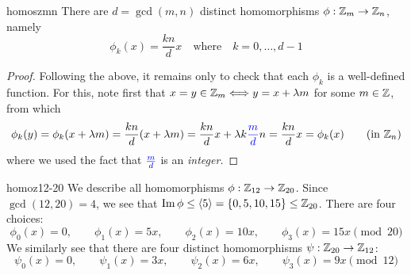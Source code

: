 \begin{cor}{}{homoszmn}
	There are $d=\gcd(m,n)$ distinct homomorphisms $\phi:\mathbb{Z}_m\to\mathbb{Z}_n$, namely
	\[
		\phi_k(x)=\frac{kn}{d}x
		\quad\text{where}\quad 
		k=0,\ldots,d-1
	\]
\end{cor}

\begin{proof}
	Following the above, it remains only to check that each $\phi_k$ is a well-defined function. For this, note first that $x=y\in\mathbb{Z}_m\Longleftrightarrow y=x+\lambda m$ for some $m\in\mathbb{Z}$, from which
	\[
	\phi_k(y)=\phi_k(x+\lambda m)
	=\frac{kn}d(x+\lambda m) 
	=\frac{kn}dx+\lambda k\textcolor{blue}{\frac md} n
	=\frac{kn}dx =\phi_k(x)
	\tag{in $\Z_n$}
	\]
	where we used the fact that $\textcolor{blue}{\frac md}$ is an \emph{integer.}
\end{proof}


\goodbreak


\begin{example}{}{homoz12-20}
	We describe all homomorphisms $\phi:\mathbb{Z}_{12}\to\mathbb{Z}_{20}$.\smallbreak
	Since $\gcd(12,20)=4$, we see that $\operatorname{Im}\phi\le\left\langle 5\right\rangle=\{0,5,10,15\}\le\mathbb{Z}_{20}$. There are four choices:
	\[
		\phi_0(x)=0,\qquad 
		\phi_1(x)=5x,\qquad 
		\phi_2(x)=10x,\qquad 
		\phi_3(x)=15x\pmod{20}
	\]
	We similarly see that there are four distinct homomorphisms $\psi:\mathbb{Z}_{20}\to\mathbb{Z}_{12}$:
	\[
		\psi_0(x)=0,\qquad 
		\psi_1(x)=3x,\qquad 
		\psi_2(x)=6x,\qquad 
		\psi_3(x)=9x\pmod{12}
	\]
\end{example} 



